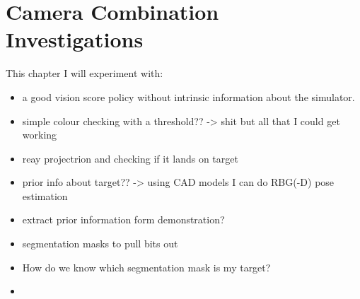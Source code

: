 \chapter{Camera Combination Investigations}
This chapter I will experiment with:
\begin{itemize}
  \item a good vision score policy without intrinsic information about the simulator.
    \item simple colour checking with a threshold?? -> shit but all that I could get working 
    \item  reay projectrion and checking if it lands on target
      \item  prior info about target?? -> using CAD models I can do RBG(-D) pose estimation
      \item extract prior information form demonstration?
  \item segmentation masks to pull bits out
    \item  How do we know which segmentation mask is my target?
  \item 
\end{itemize}




